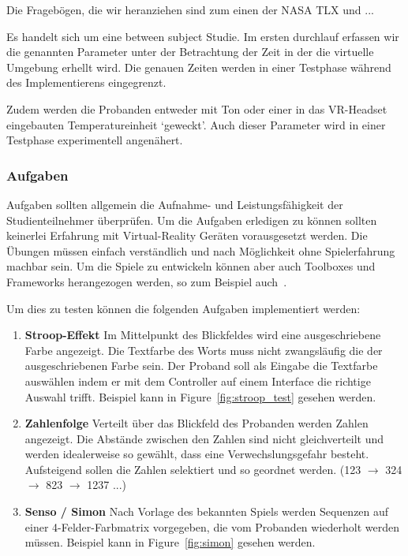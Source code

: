 \documentclass[a4paper, 11pt]{article}
\begin{document}
Die Fragebögen, die wir heranziehen sind zum einen der NASA TLX und ...

Es handelt sich um eine between subject Studie. Im ersten durchlauf erfassen wir die genannten Parameter unter der Betrachtung der Zeit in der die virtuelle Umgebung erhellt wird. Die genauen Zeiten werden in einer Testphase während des Implementierens eingegrenzt.

Zudem werden die Probanden entweder mit Ton oder einer in das VR-Headset eingebauten Temperatureinheit `geweckt'. Auch dieser Parameter wird in einer Testphase experimentell angenähert.

\subsubsection*{Aufgaben}
Aufgaben sollten allgemein die Aufnahme- und Leistungsfähigkeit der Studienteilnehmer überprüfen. Um die Aufgaben erledigen zu können sollten keinerlei Erfahrung mit Virtual-Reality Geräten vorausgesetzt werden. Die Übungen müssen einfach verständlich und nach Möglichkeit ohne Spielerfahrung machbar sein. Um die Spiele zu entwickeln können aber auch Toolboxes und Frameworks herangezogen werden, so zum Beispiel auch~\cite{devisch2018mini}.

Um dies zu testen können die folgenden Aufgaben implementiert werden:
\begin{enumerate}
    \item \textbf{Stroop-Effekt} Im Mittelpunkt des Blickfeldes wird eine ausgeschriebene Farbe angezeigt. Die Textfarbe des Worts muss nicht zwangsläufig die der ausgeschriebenen Farbe sein. Der Proband soll als Eingabe die Textfarbe auswählen indem er mit dem Controller auf einem Interface die richtige Auswahl trifft. Beispiel kann in Figure~\ref{fig:stroop_test} gesehen werden.
    \item \textbf{Zahlenfolge} Verteilt über das Blickfeld des Probanden werden Zahlen angezeigt. Die Abstände zwischen den Zahlen sind nicht gleichverteilt und werden idealerweise so gewählt, dass eine Verwechslungsgefahr besteht. Aufsteigend sollen die Zahlen selektiert und so geordnet werden. (123 $\rightarrow$ 324 $\rightarrow$ 823 $\rightarrow$ 1237 ...)
    \item \textbf{Senso / Simon} Nach Vorlage des bekannten Spiels werden Sequenzen auf einer 4-Felder-Farbmatrix vorgegeben, die vom Probanden wiederholt werden müssen. Beispiel kann in Figure~\ref{fig:simon} gesehen werden.
\end{enumerate}
\end{document}
